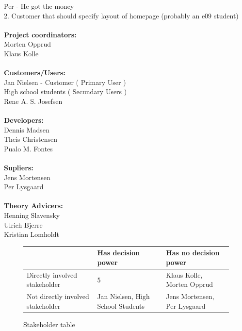 Per - He got the money\\
2. Customer that should specify layout of homepage (probably an e09 student)\\
\\
\textbf{Project coordinators:}\\
Morten Opprud\\
Klaus Kolle\\
\\
\textbf{Customers/Users:}\\
Jan Nielsen - Customer ( Primary User )\\
High school students ( Secundary Users )\\
Rene A. S. Josefsen\\
\\
\textbf{Developers:}\\
Dennis Madsen\\
Theis Christensen\\
Pualo M. Fontes\\
\\
\textbf{Supliers:}\\
Jens Mortensen\\
Per Lysgaard\\
\\
\textbf{Theory Advicers:}\\
Henning Slavensky\\
Ulrich Bjerre\\
Kristian Lomholdt\\

\begin{figure}[h!]
 \begin{centering}
  \begin{tabular}{| l | l | l | }
   \hline
      & Has decision power & Has no decision power \\ \hline
    Directly involved stakeholder & 5 & Klaus Kolle, Morten Opprud \\ \hline
    Not directly involved stakeholder & Jan Nielsen, High School Students & Jens
    Mortensen, Per Lysgaard \\
    \hline
   \end{tabular}
  \end{centering}
 \caption{Stakeholder table}
\end{figure}

